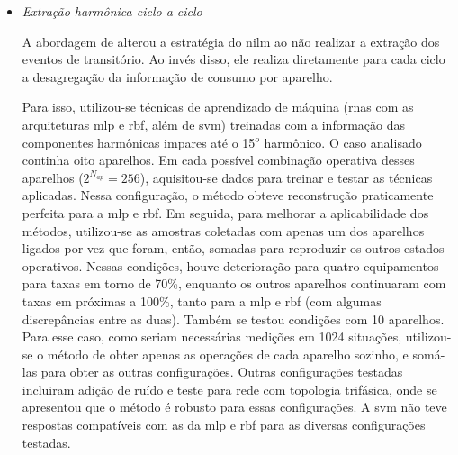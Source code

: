 \begin{enumerate}[label=\textbf{2.\arabic*},wide=\parindent]
\begin{itemize}[wide=\parindent]
\item \emph{Extração harmônica ciclo a ciclo}
\label{nilm:harmonico_ciclo_ciclo}

A abordagem de \citet{nilm_srinivasan_nn_2006_27} alterou a estratégia
do \gls{nilm} ao não realizar a extração dos eventos de transitório.
Ao invés disso, ele realiza diretamente para cada ciclo a desagregação
da informação de consumo por aparelho. 

Para isso, utilizou-se técnicas de aprendizado
de máquina (\glspl{rna} com as arquiteturas \acs{mlp} e
\acs{rbf}, além de \acs{svm}) treinadas com a informação das
componentes harmônicas impares até o 15$^o$ harmônico. O caso
analisado continha oito aparelhos. Em cada possível combinação
operativa desses aparelhos ($2^{N_{ap}}=256$), aquisitou-se dados para
treinar e testar as técnicas aplicadas. Nessa configuração, o método
obteve reconstrução praticamente perfeita para a \gls{mlp} e
\gls{rbf}. Em seguida, para melhorar a aplicabilidade dos métodos,
utilizou-se as amostras coletadas com apenas um dos aparelhos ligados
por vez que foram, então, somadas para reproduzir os outros estados
operativos. Nessas condições, houve deterioração para quatro
equipamentos para taxas em torno de 70\%, enquanto os outros aparelhos
continuaram com taxas em próximas a 100\%, tanto para a \gls{mlp} e
\gls{rbf} (com algumas discrepâncias entre as duas). Também se testou
condições com 10 aparelhos. Para esse caso, como seriam necessárias
medições em 1024 situações, utilizou-se o método de obter apenas as
operações de cada aparelho sozinho, e somá-las para obter as outras
configurações. Outras configurações testadas incluiram adição de
ruído e teste para rede com topologia trifásica, onde se apresentou
que o método é robusto para essas configurações. A \gls{svm} não teve
respostas compatíveis com as da \gls{mlp} e \gls{rbf} para as diversas
configurações testadas.


\end{itemize}
\end{enumerate}
